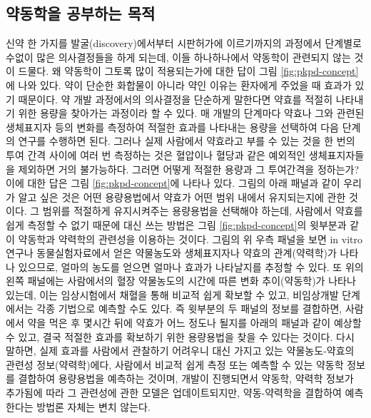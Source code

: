 \documentclass[
  11pt,
  krantz2, a4paper, twoside]{krantz}
\theoremstyle{definition}
\theoremstyle{definition}
\theoremstyle{definition}
\theoremstyle{definition}
\theoremstyle{remark}
\begin{document}

\hypertarget{uxc57duxb3d9uxd559uxc744-uxacf5uxbd80uxd558uxb294-uxbaa9uxc801}{%
\subsection{약동학을 공부하는 목적}\label{uxc57duxb3d9uxd559uxc744-uxacf5uxbd80uxd558uxb294-uxbaa9uxc801}}


신약 한 가지를 발굴(discovery)에서부터 시판허가에 이르기까지의 과정에서
단계별로 수없이 많은 의사결정들을 하게 되는데, 이들 하나하나에서
약동학이 관련되지 않는 것이 드물다. 왜 약동학이 그토록 많이 적용되는가에
대한 답이 그림 \ref{fig:pkpd-concept}에 나와 있다. 약이 단순한 화합물이 아니라 약인 이유는
환자에게 주었을 때 효과가 있기 때문이다. 약 개발 과정에서의 의사결정을
단순하게 말한다면 약효를 적절히 나타내기 위한 용량을 찾아가는 과정이라
할 수 있다. 매 개발의 단계마다 약효나 그와 관련된 생체표지자 등의 변화를
측정하여 적절한 효과를 나타내는 용량을 선택하여 다음 단계의 연구를
수행하면 된다. 그러나 실제 사람에서 약효라고 부를 수 있는 것을 한 번의
투여 간격 사이에 여러 번 측정하는 것은 혈압이나 혈당과 같은 예외적인
생체표지자들을 제외하면 거의 불가능하다. 그러면 어떻게 적절한 용량과 그
투여간격을 정하는가? 이에 대한 답은 그림 \ref{fig:pkpd-concept}에 나타나 있다. 그림의 아래
패널과 같이 우리가 알고 싶은 것은 어떤 용량용법에서 약효가 어떤 범위
내에서 유지되는지에 관한 것이다. 그 범위를 적절하게 유지시켜주는
용량용법을 선택해야 하는데, 사람에서 약효를 쉽게 측정할 수 없기 때문에
대신 쓰는 방법은 그림 \ref{fig:pkpd-concept}의 윗부분과 같이 약동학과 약력학의 관련성을
이용하는 것이다. 그림의 위 우측 패널을 보면 in vitro 연구나
동물실험자료에서 얻은 약물농도와 생체표지자나 약효의 관계(약력학)가
나타나 있으므로, 얼마의 농도를 얻으면 얼마나 효과가 나타날지를 추정할 수
있다. 또 위의 왼쪽 패널에는 사람에서의 혈장 약물농도의 시간에 따른 변화
추이(약동학)가 나타나 있는데, 이는 임상시험에서 채혈을 통해 비교적 쉽게
확보할 수 있고, 비임상개발 단계에서는 각종 기법으로 예측할 수도 있다.
즉 윗부분의 두 패널의 정보를 결합하면, 사람에서 약을 먹은 후 몇시간 뒤에 약효가 어느 정도나 될지를 아래의 패널과 같이 예상할 수 있고,
결국 적절한 효과를 확보하기 위한 용량용법을 찾을 수 있다는 것이다. 다시
말하면, 실제 효과를 사람에서 관찰하기 어려우니 대신 가지고 있는
약물농도-약효의 관련성 정보(약력학)에다, 사람에서 비교적 쉽게 측정 또는
예측할 수 있는 약동학 정보를 결합하여 용량용법을 예측하는 것이며, 개발이
진행되면서 약동학, 약력학 정보가 추가됨에 따라 그 관련성에 관한 모델은 업데이트되지만,
약동-약력학을 결합하여 예측한다는 방법론 자체는 변치 않는다.
\end{document}
